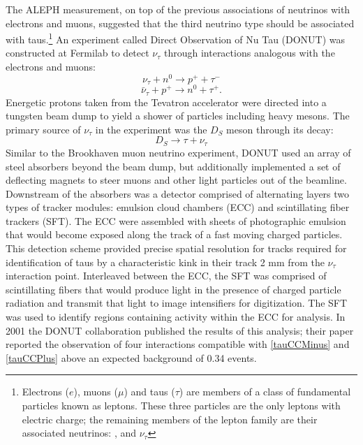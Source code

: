 The ALEPH measurement, on top of the previous associations of neutrinos with electrons and muons, suggested that the third neutrino type should be associated with taus.\footnote{Electrons ($e$), muons ($\mu$) and taus ($\tau$) are members of a class of fundamental particles known as leptons.  These three particles are the only leptons with electric charge; the remaining members of the lepton family are their associated neutrinos: \nue, \numu and $\nu_\tau$  }  An experiment called Direct Observation of Nu Tau (DONUT) was constructed at Fermilab to detect $\nu_\tau$ through interactions analogous with the electrons and muons:
\begin{equation} \label{tauCCMinus}\nu_\tau + n^0 \rightarrow  p^+ + \tau^- \end{equation}
\begin{equation} \label{tauCCPlus}\bar{\nu}_\tau + p^+ \rightarrow n^0 + \tau^+ . \end{equation}
Energetic protons taken from the Tevatron accelerator were directed into a tungsten beam dump to yield a shower of particles including heavy mesons.  The primary source of $\nu_\tau$ in the experiment was the $D_S$ meson through its decay:
\begin{equation}\label{nuTauDS}
D_S \rightarrow \tau + \nu_\tau
\end{equation}
Similar to the Brookhaven muon neutrino experiment, DONUT used an array of steel absorbers beyond the beam dump, but additionally implemented a set of deflecting magnets to steer muons and other light particles out of the beamline.  Downstream of the absorbers was a detector comprised of alternating layers two types of tracker modules: emulsion cloud chambers (ECC) and scintillating fiber trackers (SFT).  The ECC were assembled with sheets of photographic emulsion that would become exposed along the track of a fast moving charged particles.  This detection scheme provided precise spatial resolution for tracks required for identification of taus by a characteristic kink in their track 2 mm from the $\nu_\tau$ interaction point.  Interleaved between the ECC, the SFT was comprised of scintillating fibers that would produce light in the presence of charged particle radiation and transmit that light to image intensifiers for digitization.  The SFT was used to identify regions containing activity within the ECC for analysis.  In 2001 the DONUT collaboration published the results of this analysis; their paper reported the observation of four interactions compatible with \eqref{tauCCMinus} and \eqref{tauCCPlus} above an expected background of 0.34 events.  \cite{nuTau}

